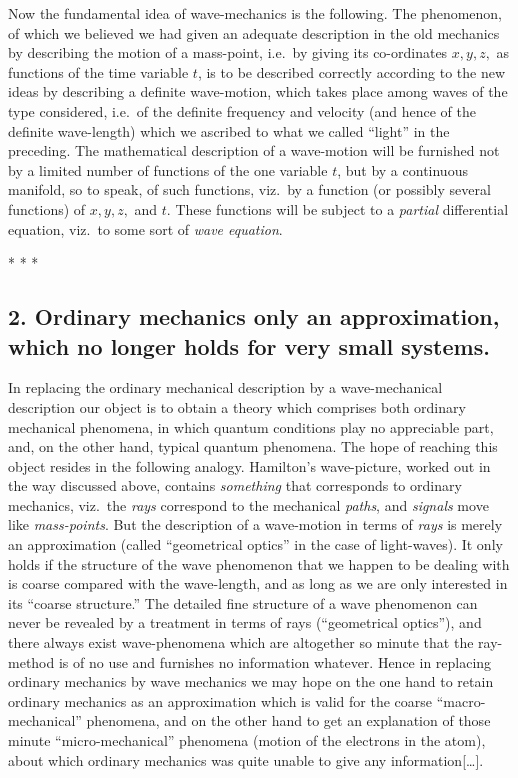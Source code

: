 Now the fundamental idea of wave-mechanics is the following. The
phenomenon, of which we believed we had given an adequate description in
the old mechanics by describing the motion of a mass-point, i.e.\ by
giving its co-ordinates $x, y, z,$ as functions of the
time variable $t$, is to be described correctly according to the
new ideas by describing a definite wave-motion, which takes place among
waves of the type considered, i.e.\ of the definite frequency and
velocity (and hence of the definite wave-length) which we ascribed to
what we called ``light'' in the preceding. The mathematical description
of a wave-motion will be furnished not by a limited number of functions
of the one variable $t$, but by a continuous manifold, so to speak,
of such functions, viz.\ by a function (or possibly several functions) of
$x, y, z,$ and $t$. These functions will be
subject to a \emph{partial} differential equation, viz.\ to some sort of
\emph{wave equation}.

\centerline{* * *}

\subsection{2. Ordinary mechanics only an approximation, which no longer holds for
very small systems.}

In replacing the ordinary mechanical description by a wave-mechanical
description our object is to obtain a theory which comprises both
ordinary mechanical phenomena, in which quantum conditions play no
appreciable part, and, on the other hand, typical quantum phenomena. The
hope of reaching this object resides in the following analogy.
Hamilton's wave-picture, worked out in the way discussed above, contains
\emph{something} that corresponds to ordinary mechanics, viz.\ the
\emph{rays} correspond to the mechanical \emph{paths}, and
\emph{signals} move like \emph{mass-points}. But the description of a
wave-motion in terms of \emph{rays} is merely an approximation (called
``geometrical optics'' in the case of light-waves). It only holds if the
structure of the wave phenomenon that we happen to be dealing with is
coarse compared with the wave-length, and as long as we are only
interested in its ``coarse structure.'' The detailed fine structure of a
wave phenomenon can never be revealed by a treatment in terms of rays
(``geometrical optics''), and there always exist wave-phenomena which
are altogether so minute that the ray-method is of no use and furnishes
no information whatever. Hence in replacing ordinary mechanics by wave
mechanics we may hope on the one hand to retain ordinary mechanics as an
approximation which is valid for the coarse ``macro-mechanical''
phenomena, and on the other hand to get an explanation of those minute
``micro-mechanical'' phenomena (motion of the electrons in the atom),
about which ordinary mechanics was quite unable to give any information[\ldots].

